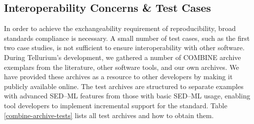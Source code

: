 \documentclass[10pt,letterpaper]{article}
\begin{document}
\subsection*{Interoperability Concerns \& Test Cases}

In order to achieve the exchangeability requirement of reproducibility, broad standards compliance is necessary. A small number of test cases, such as the first two case studies, is not sufficient to ensure interoperability with other software.
During Tellurium's development, we gathered a number of COMBINE archive exemplars from the literature, other software tools, and our own archives. We have provided these archives as a resource to other developers by making it publicly available online. The test archives are structured to separate examples with advanced SED--ML features from those with basic SED--ML usage, enabling tool developers to implement incremental support for the standard. Table \ref{combine-archive-tests} lists all test archives and how to obtain them.



\end{document}
